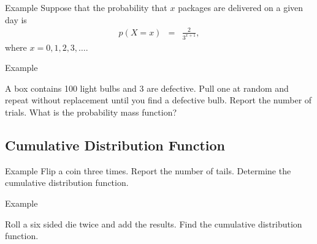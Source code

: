 \begin{frame}{Example}
  Suppose that the probability that $x$ packages are delivered on a
  given day is 
  \begin{eqnarray*}
    p(X=x) & = & \frac{2}{3^{x+1}},
  \end{eqnarray*}
  where $x=0,1,2,3,\ldots$.
\end{frame}

\begin{frame}{Example}

  A box contains 100 light bulbs and 3 are defective. Pull one at
  random and repeat without replacement until you find a defective
  bulb. Report the number of trials. What is the probability mass
  function?
  
\end{frame}

\subsection{Cumulative Distribution Function}

\begin{frame}{Example}
  Flip a coin three times. Report the number of tails. Determine the
  cumulative distribution function.
\end{frame}


\begin{frame}{Example}

  Roll a six sided die twice and add the results. Find the cumulative
  distribution function.

  
\end{frame}




